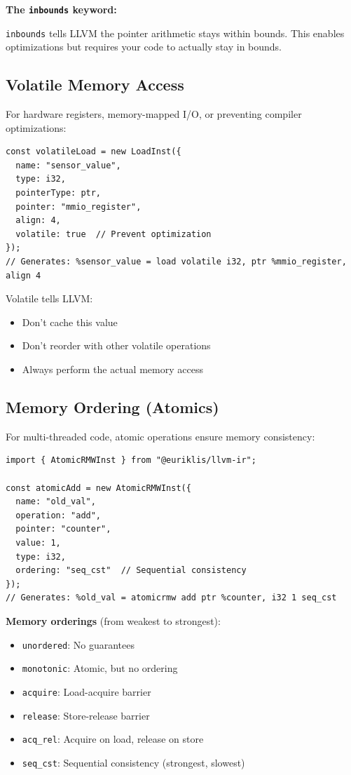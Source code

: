 \documentclass[11pt]{article}
\begin{document}
\textbf{The \texttt{inbounds} keyword:}

\texttt{inbounds} tells LLVM the pointer arithmetic stays within bounds. This enables optimizations but requires your code to actually stay in bounds.

\subsection{Volatile Memory Access}

For hardware registers, memory-mapped I/O, or preventing compiler optimizations:

\begin{lstlisting}[style=ts]
const volatileLoad = new LoadInst({
  name: "sensor_value",
  type: i32,
  pointerType: ptr,
  pointer: "mmio_register",
  align: 4,
  volatile: true  // Prevent optimization
});
// Generates: %sensor_value = load volatile i32, ptr %mmio_register, align 4
\end{lstlisting}

Volatile tells LLVM:
\begin{itemize}[noitemsep]
  \item Don't cache this value
  \item Don't reorder with other volatile operations
  \item Always perform the actual memory access
\end{itemize}

\subsection{Memory Ordering (Atomics)}

For multi-threaded code, atomic operations ensure memory consistency:

\begin{lstlisting}[style=ts]
import { AtomicRMWInst } from "@euriklis/llvm-ir";

const atomicAdd = new AtomicRMWInst({
  name: "old_val",
  operation: "add",
  pointer: "counter",
  value: 1,
  type: i32,
  ordering: "seq_cst"  // Sequential consistency
});
// Generates: %old_val = atomicrmw add ptr %counter, i32 1 seq_cst
\end{lstlisting}

\textbf{Memory orderings} (from weakest to strongest):
\begin{itemize}[noitemsep]
  \item \texttt{unordered}: No guarantees
  \item \texttt{monotonic}: Atomic, but no ordering
  \item \texttt{acquire}: Load-acquire barrier
  \item \texttt{release}: Store-release barrier
  \item \texttt{acq\_rel}: Acquire on load, release on store
  \item \texttt{seq\_cst}: Sequential consistency (strongest, slowest)
\end{itemize}
\end{document}
